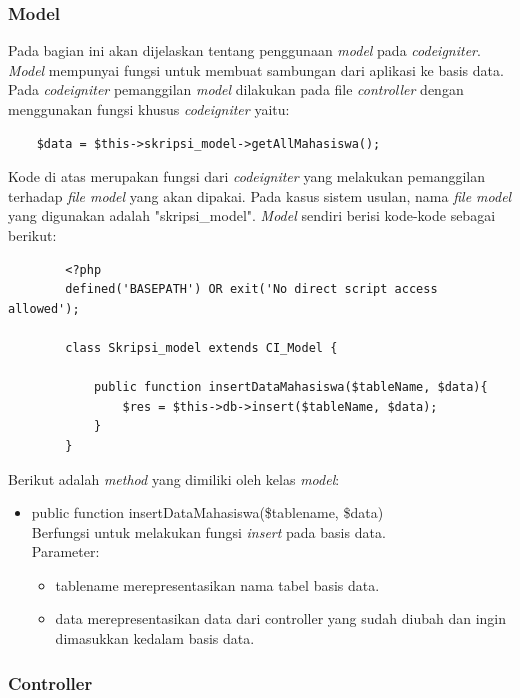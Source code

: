	\subsubsection{Model}
	\label{subsub: modelCI}
	
	Pada bagian ini akan dijelaskan tentang penggunaan \textit{model} pada \textit{codeigniter}. \textit{Model} mempunyai fungsi untuk membuat sambungan dari aplikasi ke basis data. Pada \textit{codeigniter} pemanggilan \textit{model} dilakukan pada file \textit{controller} dengan menggunakan fungsi khusus \textit{codeigniter} yaitu:
	\begin{lstlisting}
	$data = $this->skripsi_model->getAllMahasiswa();
	\end{lstlisting}
	
	Kode di atas merupakan fungsi dari \textit{codeigniter} yang melakukan pemanggilan terhadap \textit{file model} yang akan dipakai. Pada kasus sistem usulan, nama \textit{file model} yang digunakan adalah "skripsi\_model". \textit{Model} sendiri berisi kode-kode sebagai berikut:
	\begin{lstlisting}
		<?php
		defined('BASEPATH') OR exit('No direct script access allowed');
		
		class Skripsi_model extends CI_Model {
		
			public function insertDataMahasiswa($tableName, $data){
				$res = $this->db->insert($tableName, $data);
			}
		}
	\end{lstlisting}
	
	Berikut adalah \textit{method} yang dimiliki oleh kelas \textit{model}:
	\begin{itemize}
		\item public function insertDataMahasiswa(\$tablename, \$data)\\
		Berfungsi untuk melakukan fungsi \textit{insert} pada basis data.\\
		Parameter: 
		\begin{itemize}
			\item tablename merepresentasikan nama tabel basis data.
			\item data merepresentasikan data dari controller yang sudah diubah dan ingin dimasukkan kedalam basis data.
		\end{itemize}
	\end{itemize}
	
	\subsubsection{Controller}
	\label{subsub: controllerCI}
	
